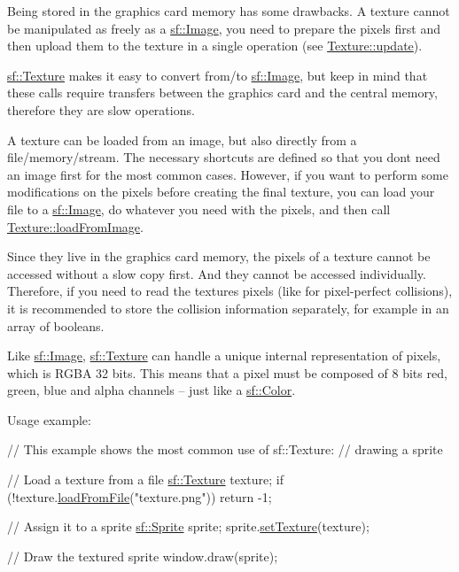 Being stored in the graphics card memory has some drawbacks. A texture cannot be manipulated as freely as a \hyperlink{classsf_1_1_image}{sf\+::\+Image}, you need to prepare the pixels first and then upload them to the texture in a single operation (see \hyperlink{classsf_1_1_texture_ae4eab5c6781316840b0c50ad08370963}{Texture\+::update}).

\hyperlink{classsf_1_1_texture}{sf\+::\+Texture} makes it easy to convert from/to \hyperlink{classsf_1_1_image}{sf\+::\+Image}, but keep in mind that these calls require transfers between the graphics card and the central memory, therefore they are slow operations.

A texture can be loaded from an image, but also directly from a file/memory/stream. The necessary shortcuts are defined so that you don\textquotesingle{}t need an image first for the most common cases. However, if you want to perform some modifications on the pixels before creating the final texture, you can load your file to a \hyperlink{classsf_1_1_image}{sf\+::\+Image}, do whatever you need with the pixels, and then call \hyperlink{classsf_1_1_texture_abec4567ad9856a3596dc74803f26fba2}{Texture\+::load\+From\+Image}.

Since they live in the graphics card memory, the pixels of a texture cannot be accessed without a slow copy first. And they cannot be accessed individually. Therefore, if you need to read the texture\textquotesingle{}s pixels (like for pixel-\/perfect collisions), it is recommended to store the collision information separately, for example in an array of booleans.

Like \hyperlink{classsf_1_1_image}{sf\+::\+Image}, \hyperlink{classsf_1_1_texture}{sf\+::\+Texture} can handle a unique internal representation of pixels, which is R\+G\+BA 32 bits. This means that a pixel must be composed of 8 bits red, green, blue and alpha channels -- just like a \hyperlink{classsf_1_1_color}{sf\+::\+Color}.

Usage example\+: 
\begin{DoxyCode}
\textcolor{comment}{// This example shows the most common use of sf::Texture:}
\textcolor{comment}{// drawing a sprite}

\textcolor{comment}{// Load a texture from a file}
\hyperlink{classsf_1_1_texture}{sf::Texture} texture;
\textcolor{keywordflow}{if} (!texture.\hyperlink{classsf_1_1_texture_a8e1b56eabfe33e2e0e1cb03712c7fcc7}{loadFromFile}(\textcolor{stringliteral}{"texture.png"}))
    \textcolor{keywordflow}{return} -1;

\textcolor{comment}{// Assign it to a sprite}
\hyperlink{classsf_1_1_sprite}{sf::Sprite} sprite;
sprite.\hyperlink{classsf_1_1_sprite_a3729c88d88ac38c19317c18e87242560}{setTexture}(texture);

\textcolor{comment}{// Draw the textured sprite}
window.draw(sprite);
\end{DoxyCode}




